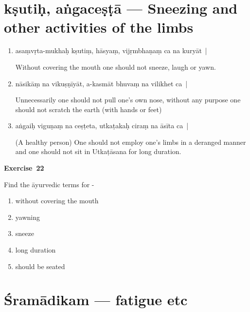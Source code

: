 \chapter{kṣutiḥ, aṅgaceṣṭā --- Sneezing and other activities of the limbs}

\begin{enumerate}
\itemsep=0pt
\item {}

asaṃvṛta-mukhaḥ kṣutiṃ, hāsyaṃ,  vijṛmbhaṇaṃ ca na kuryāt~| 

Without covering the mouth one should not sneeze, laugh or yawn. 

\item {}

nāsikāṃ na vikuṣṇīyāt, a-kasmāt bhuvaṃ na vilikhet ca~| 

Unnecessarily one should not pull one's own nose, without any purpose one should not scratch the earth (with hands or feet)

\item {}

aṅgaiḥ viguṇaṃ na ceṣṭeta, utkaṭakaḥ ciraṃ na āsīta ca~| 

(A healthy person) One should not employ one's limbs in a deranged manner and one should not sit in Utkaṭāsana for long duration.
\end{enumerate}

\centerline{\textbf{Exercise~22}}

Find the āyurvedic terms for -
\begin{enumerate}
\itemsep=0pt
\renewcommand{\theenumi}{\alph{enumi}}
\renewcommand{\labelenumi}{\theenumi.}
\item without covering the mouth
\item yawning 
\item sneeze 
\item long duration
\item should be seated
\end{enumerate}

\chapter{Śramādikam --- fatigue etc}


